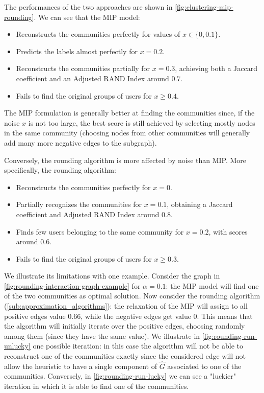 The performances of the two approaches are shown in
\autoref{fig:clustering-mip-rounding}. We can see that the MIP model:
\begin{itemize}
	\item Reconstructs the communities perfectly for values of $x \in \{0,
		      0.1\}$.
	\item Predicts the labels almost perfectly for $x= 0.2$.
	\item Reconstructs the communities partially for $x = 0.3$, achieving both
	      a Jaccard coefficient and an Adjusted RAND Index around $0.7$.
	\item Fails to find the original groups of users for $x \geq 0.4$.
\end{itemize}

The MIP formulation is generally better at finding the communities since, if
the noise $x$ is not too large, the best score is still achieved
by selecting mostly nodes in the same community (choosing nodes from other
communities will generally add many more negative edges to the subgraph).

Conversely, the rounding algorithm is more affected by noise than MIP. More
specifically, the rounding algorithm:
\begin{itemize}
	\item Reconstructs the communities perfectly for $x = 0$.
	\item Partially recognizes the communities for $x= 0.1$, obtaining a
	      Jaccard coefficient and Adjusted RAND Index around $0.8$.
	\item Finds few users belonging to the same community for $x = 0.2$, with
	      scores around $0.6$.
	\item Fails to find the original groups of users for $x \geq 0.3$.
\end{itemize}
We illustrate its limitations with one example. Consider the graph in
\autoref{fig:rounding-interaction-graph-example} for $\alpha = 0.1$:
the MIP model will find one of the two communities as optimal solution.
Now consider the rounding algorithm (\autoref{sub:approximation_algorithms}):
the relaxation of the MIP will assign to all positive edges value
$0.66$, while the negative edges get value $0$. This means that the algorithm
will initially iterate over the positive edges, choosing randomly among them (since they have the same value).
We illustrate in \autoref{fig:rounding-run-unlucky} one possible iteration: in
this case the algorithm will not be able to reconstruct one of the communities
exactly since the considered edge will not allow the heuristic to have a single component of
$\hat{G}$ associated to one of the communities.
Conversely, in \autoref{fig:rounding-run-lucky} we can see a "luckier"
iteration in which it is able to find one of the communities.


